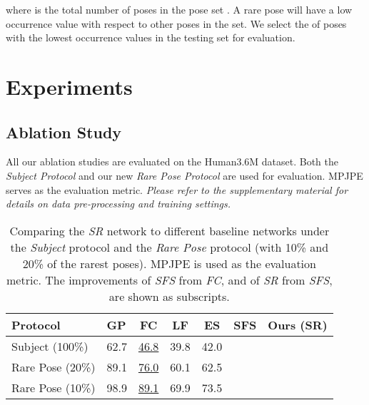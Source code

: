\documentclass[runningheads]{llncs}
\begin{document}
where  is the total number of poses in the pose set . A rare pose will have a low occurrence value with respect to other poses in the set. We select the  of poses with the lowest occurrence values in the testing set for evaluation. 















\section{Experiments}
\label{sec:result}



























\subsection{Ablation Study}
\label{sec:ablation}
All our ablation studies are evaluated on the Human3.6M dataset. Both the \emph{Subject Protocol} and our new \emph{Rare Pose Protocol} are used for evaluation. MPJPE serves as the evaluation metric. \emph{Please refer to the supplementary material for details on data pre-processing and training settings.}




\begin{table}[b]
{
\begin{center}
\begin{tabular}{ l |a| c|| c |c |c ||c }
\hline
 Protocol & GP& FC & LF & ES & SFS  & Ours (SR)\\
\hline
Subject (100\%) & 62.7 & \underline{46.8} &39.8 &42.0&&\\
\hline
Rare Pose (20\%)& 89.1 & \underline{76.0} &  60.1&62.5 &  &\\
\hline
Rare Pose (10\%)& 98.9& \underline{89.1} &69.9 &73.5 & &\\
\hline
\end{tabular}
\end{center}
}
\caption{Comparing the \emph{SR} network to different baseline networks under the \emph{Subject} protocol and the \emph{Rare Pose} protocol (with 10\% and 20\% of the rarest poses). MPJPE is used as the evaluation metric. The improvements of \emph{SFS} from \emph{FC}, and of \emph{SR} from \emph{SFS}, are shown as subscripts.}
\label{tab:srpose}
\end{table}
\end{document}

